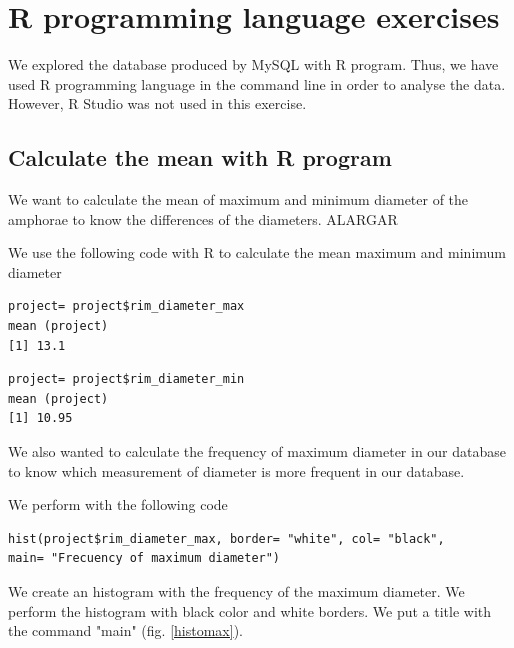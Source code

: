 \documentclass[10pt,a4paper]{article}
\begin{document}
\section{R programming language exercises}

We explored the database produced by MySQL with R program. Thus, we have used R programming language in the command line in order to analyse the data. However, R Studio was not used in this exercise. 

\subsection{Calculate the mean with R program}

We want to calculate the mean of maximum and minimum diameter of the amphorae to know the differences of the diameters. ALARGAR

We use the following code with R to calculate the mean maximum and minimum diameter

\begin{verbatim}
project= project$rim_diameter_max
mean (project)
[1] 13.1
\end{verbatim}

\begin{verbatim}
project= project$rim_diameter_min
mean (project)
[1] 10.95
\end{verbatim}

We also wanted to calculate the frequency of maximum diameter in our database to know which measurement of diameter is more frequent in our database. 

We perform with the following code

\begin{verbatim}
hist(project$rim_diameter_max, border= "white", col= "black", 
main= "Frecuency of maximum diameter")
\end{verbatim}

We create an histogram with the frequency of the maximum diameter. We perform the histogram with black color and white borders. We put a title with the command "main" (fig. \ref{histomax}).
\end{document}
